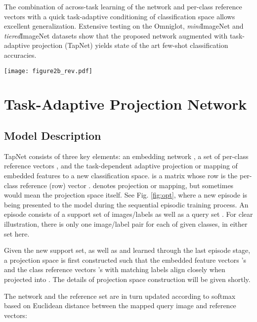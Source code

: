 \documentclass{article}
\begin{document}
The combination of across-task learning of the network and per-class reference vectors with a quick task-adaptive conditioning of classification space allows excellent generalization. Extensive testing on the Omniglot, \textit{mini}ImageNet and \textit{tiered}ImageNet datasets show that the proposed network augmented with task-adaptive projection (TapNet) yields state of the art few-shot classification accuracies. 



















\begin{figure*}
\centering
\texttt{[image: figure2b\_rev.pdf]}
\caption{TapNet learning process}
\label{fig:opt}
\end{figure*}

\section{Task-Adaptive Projection Network}
\subsection{Model Description}
TapNet consists of three key elements: an embedding network , a set of per-class reference vectors , and the task-dependent adaptive projection or mapping  of embedded features to a new classification space.  is a matrix whose  row is the per-class reference (row) vector .  denotes projection or mapping, but sometimes would mean the projection space itself. 
See Fig. \ref{fig:opt}, where a new episode is being presented to the model during the sequential episodic training process. An episode consists of a support set of images/labels  as well as a query set . For clear illustration, there is only one image/label pair for each of  given classes, in either set here.  

Given the new support set, as well as  and  learned 
through the last episode stage, a projection space  is first constructed such that the embedded feature vectors 's and the class reference vectors 's with matching labels align closely when projected into . The details of projection space construction will be given shortly.  

The network   and the reference set  are in turn updated according to softmax based on Euclidean distance 
 between the mapped query image and reference vectors: 
\end{document}
